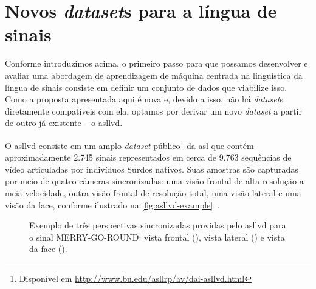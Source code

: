 \section{Novos \textit{dataset}s para a língua de sinais}
\label{sec:metodologia-datasets}

Conforme introduzimos acima, o primeiro passo para que possamos desenvolver e avaliar uma abordagem de aprendizagem de máquina centrada na linguística da língua de sinais consiste em definir um conjunto de dados que viabilize isso. Como a proposta apresentada aqui é nova e, devido a isso, não há \textit{dataset}s diretamente compatíveis com ela, optamos por derivar um novo \textit{dataset} a partir de outro já existente -- o \acrfull{asllvd}.

O \acrshort{asllvd} consiste em um amplo \textit{dataset} público\footnote{Disponível em \url{http://www.bu.edu/asllrp/av/dai-asllvd.html}} da \acrshort{asl} que contém aproximadamente 2.745 sinais representados em cerca de 9.763 sequências de vídeo articuladas por indivíduos Surdos nativos. Suas amostras são capturadas por meio de quatro câmeras sincronizadas: uma visão frontal de alta resolução a meia velocidade, outra visão frontal de resolução total, uma visão lateral e uma visão da face, conforme ilustrado na \autoref{fig:asllvd-example}~\cite{athitsos-2008-asllvd,neidle-2012-asllvd}.

\begin{figure}[ht!]
    \centering
    \caption{\textmd{Exemplo de três perspectivas sincronizadas providas pelo \acrshort{asllvd} para o sinal MERRY-GO-ROUND: 
    vista frontal (), 
    vista lateral () e 
    vista da face ().}}
    \hfill
    \hfill
    \label{fig:asllvd-example}
\end{figure}


